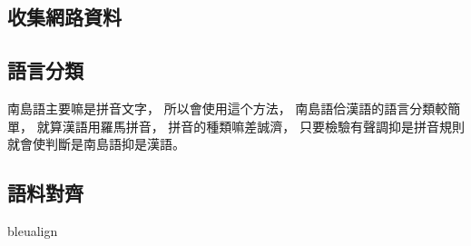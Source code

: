 \subsection{收集網路資料}
\label{小節：收集網路資料}

\subsection{語言分類}
\label{小節：語言分類}
南島語主要嘛是拼音文字，
所以會使用這个方法，
南島語佮漢語的語言分類較簡單，
就算漢語用羅馬拼音，
拼音的種類嘛差誠濟，
只要檢驗有聲調抑是拼音規則就會使判斷是南島語抑是漢語。


\subsection{語料對齊}
\label{小節：語料對齊}
bleualign




